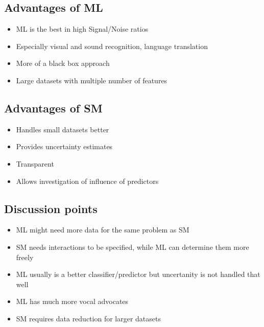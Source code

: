 \documentclass[letterpaper,10pt,english]{jupyterBook}
\begin{document}
\subsection{Advantages of ML}
\label{\detokenize{Lecture 1:advantages-of-ml}}\begin{itemize}
\item {} 
\sphinxAtStartPar
ML is the best in high Signal/Noise ratios

\item {} 
\sphinxAtStartPar
Especially visual and sound recognition, language translation

\item {} 
\sphinxAtStartPar
More of a black box approach

\item {} 
\sphinxAtStartPar
Large datasets with multiple number of features

\end{itemize}


\subsection{Advantages of SM}
\label{\detokenize{Lecture 1:advantages-of-sm}}\begin{itemize}
\item {} 
\sphinxAtStartPar
Handles small datasets better

\item {} 
\sphinxAtStartPar
Provides uncertainty estimates

\item {} 
\sphinxAtStartPar
Transparent

\item {} 
\sphinxAtStartPar
Allows investigation of influence of predictors

\end{itemize}


\subsection{Discussion points}
\label{\detokenize{Lecture 1:discussion-points}}\begin{itemize}
\item {} 
\sphinxAtStartPar
ML might need more data for the same problem as SM

\item {} 
\sphinxAtStartPar
SM needs interactions to be specified, while ML can determine them more freely

\item {} 
\sphinxAtStartPar
ML usually is a better classifier/predictor but uncertanity is not handled that well

\item {} 
\sphinxAtStartPar
ML has much more vocal advocates

\item {} 
\sphinxAtStartPar
SM requires data reduction for larger datasets

\end{itemize}
\end{document}
